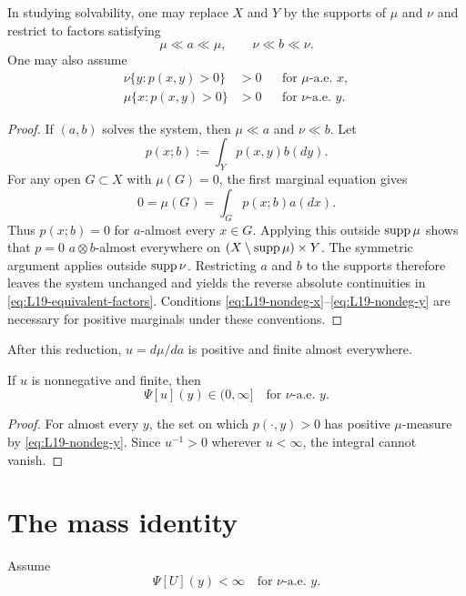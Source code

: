 \begin{proposition}\label{prop:L19-reduction}
In studying solvability, one may replace $X$ and $Y$ by the supports of $\mu$ and $\nu$ and restrict to factors satisfying
\begin{equation}\label{eq:L19-equivalent-factors}
 \mu\ll a\ll\mu,
 \qquad
 \nu\ll b\ll\nu.
\end{equation}
One may also assume
\begin{align}
 \nu\{y:p(x,y)>0\}&>0 &&\text{for $\mu$-a.e. }x,\label{eq:L19-nondeg-x}\\
 \mu\{x:p(x,y)>0\}&>0 &&\text{for $\nu$-a.e. }y.\label{eq:L19-nondeg-y}
\end{align}
\end{proposition}
\begin{proof}
If $(a,b)$ solves the system, then $\mu\ll a$ and $\nu\ll b$.  Let
\[
 p(x;b):=\int_Yp(x,y)b(dy).
\]
For any open $G\subset X$ with $\mu(G)=0$, the first marginal equation gives
\[
 0=\mu(G)=\int_Gp(x;b)a(dx).
\]
Thus $p(x;b)=0$ for $a$-almost every $x\in G$.  Applying this outside $\operatorname{supp}\mu$ shows that $p=0$ $a\otimes b$-almost everywhere on $(X\setminus\operatorname{supp}\mu)\times Y$.  The symmetric argument applies outside $\operatorname{supp}\nu$.  Restricting $a$ and $b$ to the supports therefore leaves the system unchanged and yields the reverse absolute continuities in \eqref{eq:L19-equivalent-factors}.  Conditions \eqref{eq:L19-nondeg-x}--\eqref{eq:L19-nondeg-y} are necessary for positive marginals under these conventions.
\end{proof}

After this reduction, $u=d\mu/da$ is positive and finite almost everywhere.

\begin{lemma}\label{lem:L19-psi-nonzero}
If $u$ is nonnegative and finite, then
\[
 \Psi[u](y)\in(0,\infty]
 \quad\text{for $\nu$-a.e. }y.
\]
\end{lemma}
\begin{proof}
For almost every $y$, the set on which $p(\cdot,y)>0$ has positive $\mu$-measure by \eqref{eq:L19-nondeg-y}.  Since $u^{-1}>0$ wherever $u<\infty$, the integral cannot vanish.
\end{proof}

\section{The mass identity}
Assume
\begin{equation}\label{eq:L19-psi-envelope-finite}
 \Psi[U](y)<\infty
 \quad\text{for $\nu$-a.e. }y.
\end{equation}

